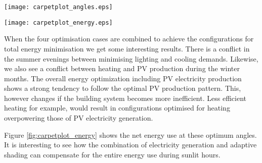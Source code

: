 	\begin{figure*}
	\begin{center}
	\texttt{[image: carpetplot\_angles.eps]}
	\caption{Carpet plots detailing the optimal configuration to minimise the (a) heating demand, (b) cooling demand, (c) lighting demand, and (d) maximise irradiance on PV panels. Each configuration is represented by an angle of orientation around the x-axis (Altitude) and y-axis (Azimuth) as seen in the legend. Figure (e) details the combinations for optimum building thermal management without PV production. (f) also includes the PV production}
	\label{fig:carpetplot}
	\end{center}
	\end{figure*}

	\begin{figure*}
	\begin{center}
	\texttt{[image: carpetplot\_energy.eps]}
	\caption{Carpet plots detailing the net energy consumption. Each square represents the total energy consumption for that specific hour of the entire month. Red colours detail the energy demand, while blue colours detail the energy supply.}
	\label{fig:carpetplot_energy}
	\end{center}
	\end{figure*}



	When the four optimisation cases are combined to achieve the configurations for total energy minimisation we get some interesting results. There is a conflict in the summer evenings between minimising lighting and cooling demands. Likewise, we also see a conflict between heating and PV production during the winter months. The overall energy optimization including PV electricity production shows a strong tendency to follow the optimal PV production pattern. This, however changes if the building system becomes more inefficient. Less efficient heating for example, would result in configurations optimised for heating overpowering those of PV electricity generation.


	Figure \ref{fig:carpetplot_energy} shows the net energy use at these optimum angles. It is interesting to see how the combination of electricity generation and adaptive shading can compensate for the entire energy use during sunlit hours.

